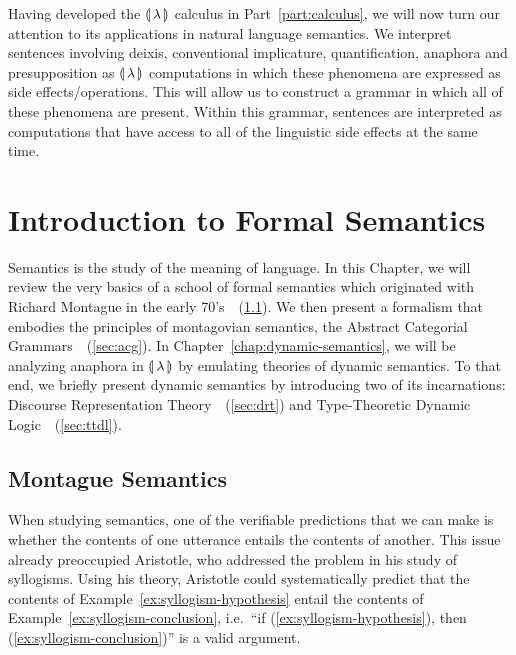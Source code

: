 Having developed the ${\llparenthesis \, \lambda \, \rrparenthesis}$ calculus in Part~\ref{part:calculus}, we will
now turn our attention to its applications in natural language
semantics. We interpret sentences involving deixis, conventional
implicature, quantification, anaphora and presupposition as ${\llparenthesis \, \lambda \, \rrparenthesis}$
computations in which these phenomena are expressed as side
effects/operations. This will allow us to construct a grammar in which all
of these phenomena are present. Within this grammar, sentences are
interpreted as computations that have access to all of the linguistic side
effects at the same time.

\EmptyNewPage


\chapter{Introduction to Formal Semantics}
\label{chap:intro-fs}

Semantics is the study of the meaning of language. In this Chapter, we will
review the very basics of a school of formal semantics which originated
with Richard Montague in the early
70's~\cite{montague1970english,montague1970universal,montague1973proper}~(\ref{sec:montague}). We
then present a formalism that embodies the principles of montagovian
semantics, the Abstract Categorial
Grammars~\cite{de2001towards}~(\ref{sec:acg}). In
Chapter~\ref{chap:dynamic-semantics}, we will be analyzing anaphora in
${\llparenthesis \, \lambda \, \rrparenthesis}$ by emulating theories of dynamic semantics. To that end, we briefly
present dynamic semantics by introducing two of its incarnations: Discourse
Representation Theory~\cite{kamp1993discourse}~(\ref{sec:drt}) and
Type-Theoretic Dynamic
Logic~\cite{de2006towards,lebedeva2012expression}~(\ref{sec:ttdl}).

\minitoc


\section{Montague Semantics}
\label{sec:montague}

When studying semantics, one of the verifiable predictions that we can make
is whether the contents of one utterance entails the contents of
another. This issue already preoccupied Aristotle, who addressed the
problem in his study of syllogisms. Using his theory, Aristotle could
systematically predict that the contents of
Example~\ref{ex:syllogism-hypothesis} entail the contents of
Example~\ref{ex:syllogism-conclusion}, i.e.\ ``if
(\ref{ex:syllogism-hypothesis}), then (\ref{ex:syllogism-conclusion})'' is
a valid argument.

